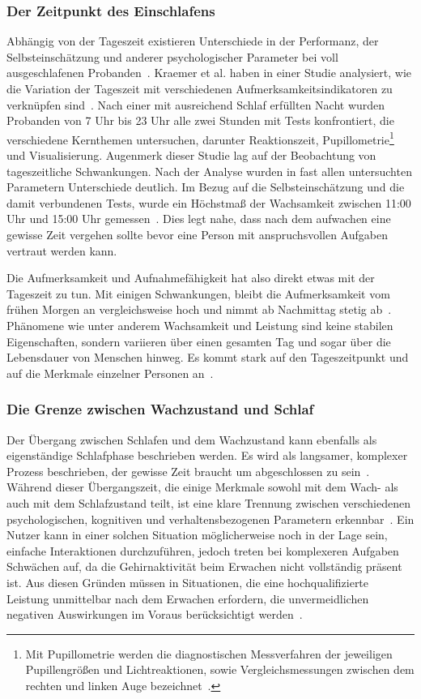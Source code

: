 \subsubsection{Der Zeitpunkt des Einschlafens}

Abhängig von der Tageszeit existieren Unterschiede in der Performanz, der Selbsteinschätzung und anderer psychologischer Parameter bei voll ausgeschlafenen Probanden~\cite{kraemer2000time}.
Kraemer et al. haben in einer Studie analysiert, wie die Variation der Tageszeit mit verschiedenen Aufmerksamkeitsindikatoren zu verknüpfen sind~\cite{kraemer2000time}. 
Nach einer mit ausreichend Schlaf erfüllten Nacht wurden Probanden von 7 Uhr bis 23 Uhr alle zwei Stunden mit Tests konfrontiert, die verschiedene Kernthemen untersuchen, darunter Reaktionszeit, Pupillometrie\footnote{Mit Pupillometrie werden die diagnostischen Messverfahren der jeweiligen Pupillengrößen und Lichtreaktionen, sowie Vergleichsmessungen zwischen dem rechten und linken Auge bezeichnet~\cite{sachsenweger1975neuroophthalmologie}.} und Visualisierung.
Augenmerk dieser Studie lag auf der Beobachtung von tageszeitliche Schwankungen. Nach der Analyse wurden in fast allen untersuchten Parametern Unterschiede deutlich. 
Im Bezug auf die Selbsteinschätzung und die damit verbundenen Tests, wurde ein Höchstmaß der Wachsamkeit zwischen 11:00 Uhr und 15:00 Uhr gemessen~\cite{kraemer2000time}. Dies legt nahe, dass nach dem aufwachen eine gewisse Zeit vergehen sollte bevor eine Person mit anspruchsvollen Aufgaben vertraut werden kann.

Die Aufmerksamkeit und Aufnahmefähigkeit hat also direkt etwas mit der Tageszeit zu tun.
Mit einigen Schwankungen, bleibt die Aufmerksamkeit vom frühen Morgen an vergleichsweise hoch und nimmt ab Nachmittag stetig ab~\cite{kraemer2000time}.
Phänomene wie unter anderem Wachsamkeit und Leistung sind keine stabilen Eigenschaften, sondern variieren über einen gesamten Tag und sogar über die Lebensdauer von Menschen hinweg. 
Es kommt stark auf den Tageszeitpunkt und auf die Merkmale einzelner Personen an~\cite{kraemer2000time}.

\subsubsection{Die Grenze zwischen Wach­zu­stand und Schlaf}

Der Übergang zwischen Schlafen und dem Wachzustand kann ebenfalls als eigenständige Schlafphase beschrieben werden. Es wird als langsamer, komplexer Prozess beschrieben, der gewisse Zeit braucht um abgeschlossen zu sein~\cite{ferrara2000sleep}. 
Während dieser Übergangszeit, die einige Merkmale sowohl mit dem Wach- als auch mit dem Schlafzustand teilt, ist eine klare Trennung zwischen verschiedenen psychologischen, kognitiven und verhaltensbezogenen Parametern erkennbar~\cite{ferrara2000sleep}. 
Ein Nutzer kann in einer solchen Situation möglicherweise noch in der Lage sein, einfache Interaktionen durchzuführen, jedoch treten bei komplexeren Aufgaben Schwächen auf, da die Gehirnaktivität beim Erwachen nicht vollständig präsent ist. 
Aus diesen Gründen müssen in Situationen, die eine hochqualifizierte Leistung unmittelbar nach dem Erwachen erfordern, die unvermeidlichen negativen Auswirkungen im Voraus berücksichtigt werden~\cite{ferrara2000sleep}.
